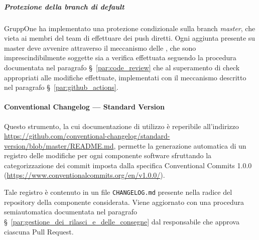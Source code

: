 \documentclass[../../norme-di-progetto.tex]{subfiles}
\begin{document}

\subparagraph{Protezione della branch di default}%
\label{subp:protezione_della_branch_di_default}

GruppOne ha implementato una protezione condizionale sulla branch \textit{master}, che vieta ai membri del team di effettuare dei push diretti. Ogni aggiunta presente su master deve avvenire attraverso il meccanismo delle , che sono imprescindibilmente soggette sia a verifica effettuata seguendo la procedura documentata nel paragrafo §~\ref{par:code_review} che al superamento di check appropriati alle modifiche effettuate, implementati con il meccanismo descritto nel paragrafo §~\ref{par:github_actions}.



\paragraph{Conventional Changelog --- Standard Version}%
\label{par:conventional_changelog_standard_version}

Questo strumento, la cui documentazione di utilizzo è reperibile all'indirizzo \href{https://github.com/conventional-changelog/standard-version/blob/master/README.md}{https://github.com/conventional-changelog/standard-version/blob/master/README.md}, permette la generazione automatica di un registro delle modifiche per ogni componente software sfruttando la categorizzazione dei commit imposta dalla specifica Conventional Commits 1.0.0 (\href{https://www.conventionalcommits.org/en/v1.0.0/}{https://www.conventionalcommits.org/en/v1.0.0/}).

Tale registro è contenuto in un file \verb|CHANGELOG.md| presente nella radice del repository della componente considerata.
Viene aggiornato con una procedura semiautomatica documentata nel paragrafo §~\ref{par:gestione_dei_rilasci_e_delle_consegne} dal responsabile che approva ciascuna Pull Request.

\end{document}
